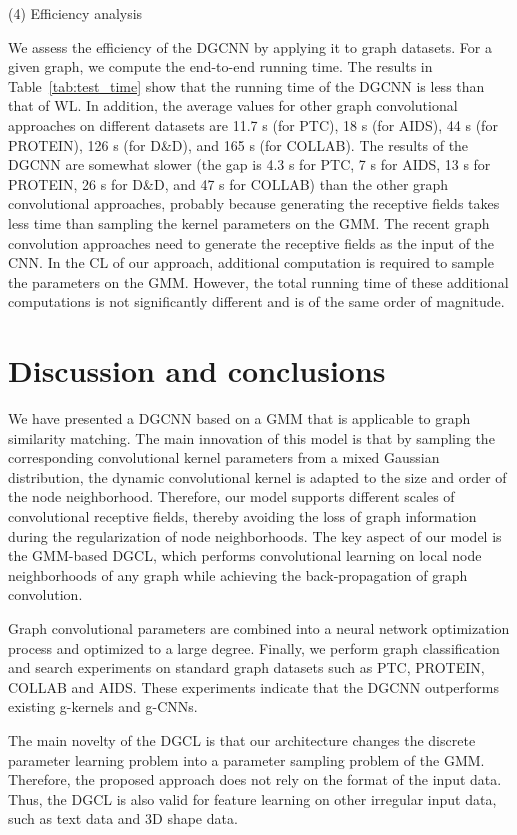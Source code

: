 \documentclass[11pt]{article}
\begin{document}
(4) Efficiency analysis



We assess the efficiency of the DGCNN by applying it to graph datasets. For a given graph, we compute the end-to-end running time. The results in Table~\ref{tab:test_time} show that the running time of the DGCNN is less than that of WL. In addition, the average values for other graph convolutional approaches on different datasets are 11.7 s (for PTC), 18 s (for AIDS), 44 s (for PROTEIN), 126 s (for D\&D), and 165 s (for COLLAB). The results of the DGCNN are somewhat slower (the gap is 4.3 s for PTC, 7 s for AIDS, 13 s for PROTEIN, 26 s for D\&D, and 47 s for COLLAB) than the other graph convolutional approaches, probably because generating the receptive fields takes less time than sampling the kernel parameters on the GMM. The recent graph convolution approaches need to generate the receptive fields as the input of the CNN. In the CL of our approach, additional computation is required to sample the parameters on the GMM. However, the total running time of these additional computations is not significantly different and is of the same order of magnitude.

\section{Discussion and conclusions}

We have presented a DGCNN based on a GMM that is applicable to graph similarity matching. The main innovation of this model is that by sampling the corresponding convolutional kernel parameters from a mixed Gaussian distribution, the dynamic convolutional kernel is adapted to the size and order of the node neighborhood. Therefore, our model supports different scales of convolutional receptive fields, thereby avoiding the loss of graph information during the regularization of node neighborhoods. The key aspect of our model is the GMM-based DGCL, which performs convolutional learning on local node neighborhoods of any graph while achieving the back-propagation of graph convolution.

Graph convolutional parameters are combined into a neural network optimization process and optimized to a large degree. Finally, we perform graph classification and search experiments on standard graph datasets such as PTC, PROTEIN, COLLAB and AIDS. These experiments indicate that the DGCNN outperforms existing g-kernels and g-CNNs.

The main novelty of the DGCL is that our architecture changes the discrete parameter learning problem into a parameter sampling problem of the GMM. Therefore, the proposed approach does not rely on the format of the input data. Thus, the DGCL is also valid for feature learning on other irregular input data, such as text data and 3D shape data.
\end{document}
